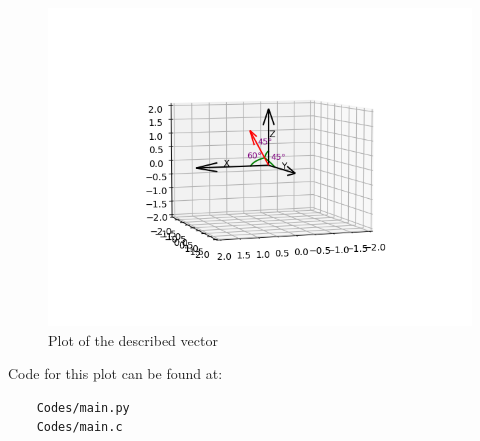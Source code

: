 \documentclass[journal]{IEEEtran}
\begin{document}
\newpage

\begin{figure}[H]
	\centering
	\includegraphics[width=0.75\columnwidth]{Figures/Figure.png}
	\caption{Plot of the described vector}
	\label{fig}
\end{figure}

Code for this plot can be found at:
\begin{lstlisting}
    Codes/main.py
    Codes/main.c
\end{lstlisting}
\end{document}
